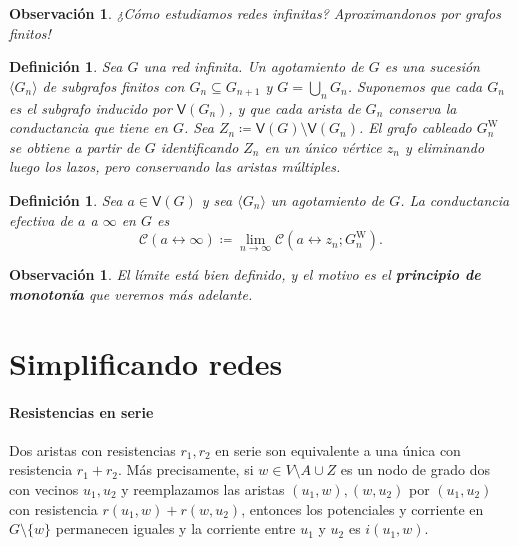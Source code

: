 \documentclass[11pt,a4paper]{article}
\newcommand{\defn}[1]{\textbf{\emph{#1}}}
\numberwithin{equation}{section}
\theoremstyle{LPplain}
\theoremstyle{LPdef}
\newtheorem{defi}[teo]{Definición}
\theoremstyle{LPrem}
\newtheorem{obs}[teo]{Observación}
\begin{document}
\begin{obs}
¿Cómo estudiamos redes infinitas? Aproximandonos por grafos finitos!
\end{obs}

\begin{defi}\label{def:exhaustion}
  Sea $G$ una red infinita. Un \textit{agotamiento} de $G$ es una sucesión
  $\langle G_n \rangle$ de subgrafos finitos con $G_n \subseteq G_{n+1}$ y
  $G = \bigcup_n G_n$. Suponemos que cada $G_n$ es el subgrafo inducido por
  $\mathsf{V}(G_n)$, y que cada arista de $G_n$ conserva la conductancia que
  tiene en $G$. Sea $Z_n \coloneqq \mathsf{V}(G) \setminus \mathsf{V}(G_n)$. El
  \textit{grafo cableado} $G_n^{\mathrm{W}}$ se obtiene a partir de $G$
  identificando $Z_n$ en un único vértice $z_n$ y eliminando luego los lazos,
  pero conservando las aristas múltiples.
\end{defi}

\begin{defi}\label{def:effective}
  Sea $a \in \mathsf{V}(G)$ y sea $\langle G_n \rangle$ un agotamiento de $G$.
  La \textit{conductancia efectiva} de $a$ a $\infty$ en $G$ es
  \[
    \mathcal{C}(a \leftrightarrow \infty)
    \coloneqq \lim_{n \to \infty}
    \mathcal{C}(a \leftrightarrow z_n; G_n^{\mathrm{W}}).
  \]
\end{defi}

\begin{obs}
  El límite está bien definido, y el motivo es el \defn{principio de monotonía} que
  veremos más adelante.
\end{obs}

\section{Simplificando redes}

\paragraph{Resistencias en serie} Dos aristas con resistencias $r_1, r_2$
en serie son equivalente a una única con resistencia $r_1 + r_2$. Más precisamente,
si $w \in V \setminus {A \cup Z}$ es un nodo de grado dos con vecinos $u_1, u_2$ y 
reemplazamos las aristas $(u_1, w), (w, u_2)$ por $(u_1, u_2)$ con resistencia
$r(u_1, w) + r(w, u_2)$, entonces los potenciales y corriente en $G\setminus\{w\}$
permanecen iguales y la corriente entre $u_1$ y $u_2$ es $i(u_1, w)$. 
\end{document}
